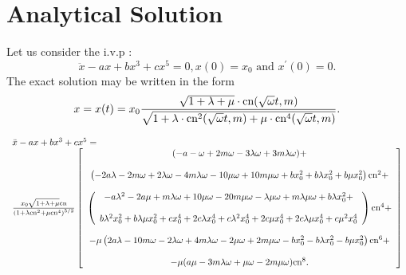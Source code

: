 \documentclass{ws-ijbc}
\begin{document}
\section{Analytical Solution}
Let us consider the i.v.p :
\begin{equation}
\ddot{x}-ax+bx^{3}+cx^{5}=0,x(0)=x_{0}\text{ and }x^{\prime }(0)=0.
\label{x1}
\end{equation}%
The exact solution may be written in the form%
\begin{equation}
x=x(t)=x_{0}\frac{\sqrt{1+\lambda +\mu }\cdot \text{cn}(\sqrt{\omega }t,m)}{%
\sqrt{1+\lambda \cdot \text{cn}^{2}(\sqrt{\omega }t,m)+\mu \cdot \text{cn}%
^{4}(\sqrt{\omega }t,m)}}.  \label{x2}
\end{equation}%


\begin{equation}
\begin{tabular}{l}
$\ddot{x}-ax+bx^{3}+cx^{5}=$ \\ 
$\frac{x_{0}\sqrt{1+\lambda +\mu }\text{cn}}{\left( 1+\lambda \text{cn}%
^{2}+\mu \text{cn}^{4}\right) ^{5/2}}\left[ 
\begin{array}{c}
(-a-\omega +2m\omega -3\lambda \omega +3m\lambda \omega )+ \\ 
\\ 
\left( -2a\lambda -2m\omega +2\lambda \omega -4m\lambda \omega -10\mu \omega
+10m\mu \omega +bx_{0}^{2}+b\lambda x_{0}^{2}+b\mu x_{0}^{2}\right) \text{cn}%
^{2}+ \\ 
\\ 
\left( 
\begin{array}{c}
-a\lambda ^{2}-2a\mu +m\lambda \omega +10\mu \omega -20m\mu \omega -\lambda
\mu \omega +m\lambda \mu \omega +b\lambda x_{0}^{2}+ \\ 
\\ 
b\lambda ^{2}x_{0}^{2}+b\lambda \mu x_{0}^{2}+cx_{0}^{4}+2c\lambda
x_{0}^{4}+c\lambda ^{2}x_{0}^{4}+2c\mu x_{0}^{4}+2c\lambda \mu
x_{0}^{4}+c\mu ^{2}x_{0}^{4}%
\end{array}%
\right) \text{cn}^{4}+ \\ 
\\ 
-\mu \left( 2a\lambda -10m\omega -2\lambda \omega +4m\lambda \omega -2\mu
\omega +2m\mu \omega -bx_{0}^{2}-b\lambda x_{0}^{2}-b\mu x_{0}^{2}\right) 
\text{cn}^{6}+ \\ 
\\ 
-\mu (a\mu -3m\lambda \omega +\mu \omega -2m\mu \omega )\text{cn}^{8}.%
\end{array}%
\right] $%
\end{tabular}
\label{x3}
\end{equation}%
\end{document}
